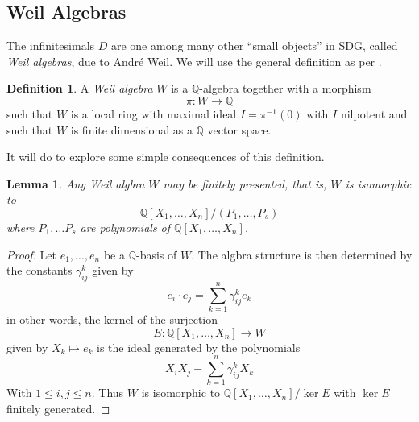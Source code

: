 \documentclass[11pt]{article}
\newtheorem{lemma}{Lemma}[section]
\theoremstyle{definition}
\newtheorem{defn}{Definition}[section]
\numberwithin{equation}{section}
\begin{document}
\subsection{Weil Algebras}

The infinitesimals \( D \) are one among many other ``small objects'' in SDG, called \emph{Weil algebras}, due to André Weil. We will use the general definition as per \cite{bun17}.

\begin{defn}
  A \emph{Weil algebra} \( W \) is a \( \mathbb{Q} \)-algebra together with a morphism
  \begin{equation*}
    \pi: W\to\mathbb Q
  \end{equation*}
  such that \( W \) is a local ring with maximal ideal \( I=\pi^{-1}(0) \) with \( I \) nilpotent and such that \( W \) is finite dimensional as a \( \mathbb{Q} \) vector space.
\end{defn}

It will do to explore some simple consequences of this definition.

\begin{lemma}
  Any Weil algbra \( W \) may be finitely presented, that is, \( W \) is isomorphic to
  \begin{equation*}
    \mathbb{Q}[X_1,\dots,X_n]/(P_1,\dots,P_s)
  \end{equation*}
  where \( P_1,\dots P_s \) are polynomials of \( \mathbb{Q}[X_1,\dots,X_n] \).
  \label{lm:finpr}
\end{lemma}

\begin{proof}
  Let \( e_1,\dots,e_n \) be a \( \mathbb{Q} \)-basis of \( W \). The algbra structure is then determined by the constants \( \gamma_{ij}^k \) given by
  \begin{equation*}
    e_i\cdot e_j = \sum_{k=1}^n \gamma_{ij}^ke_k
  \end{equation*}
  in other words, the kernel of the surjection
  \begin{equation*}
    E: \mathbb{Q}[X_1,\dots,X_n]\to W
  \end{equation*}
  given by \( X_k\mapsto e_k \) is the ideal generated by the polynomials
  \begin{equation*}
    X_iX_j - \sum_{k=1}^n\gamma_{ij}^kX_k
  \end{equation*}
  With \( 1\leq i,j\leq n \). Thus \( W \) is isomorphic to \( \mathbb{Q}[X_1,\dots,X_n]/\ker E \) with \( \ker E \) finitely generated.
\end{proof}
\end{document}
